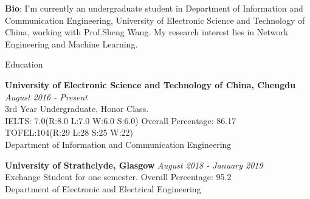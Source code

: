 \documentclass{resume} %
\begin{document}
{\bf Bio}: I'm currently an undergraduate student in Department of Information and Communication Engineering, 
University of Electronic Science and Technology of China, working with Prof.Sheng Wang. My research interest lies in Network Engineering and Machine Learning.

\begin{rSection}{Education}

\item \vspace{-1em} {\bf University of Electronic Science and Technology of China, Chengdu} \hfill {\em August 2016 - Present} 
\\ 3rd Year Undergraduate, Honor Class. 
\\IELTS: 7.0(R:8.0 L:7.0 W:6.0 S:6.0)\hfill { Overall Percentage: 86.17 }
\\TOFEL:104(R:29 L:28 S:25 W:22)
\\ Department of Information and Communication Engineering


\item {\bf University of Strathclyde, Glasgow} \hfill {\em August 2018 - January 2019} 
\\ Exchange Student for one semester.\hfill { Overall Percentage: 95.2 }
\\Department of Electronic and Electrical Engineering 


\end{rSection}
\end{document}
